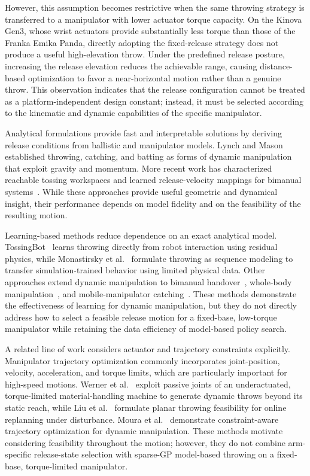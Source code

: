 \documentclass[letterpaper, 10 pt, conference]{ieeeconf}
\begin{document}
However, this assumption becomes restrictive when the same throwing strategy is transferred to a manipulator with lower actuator torque capacity. On the Kinova Gen3, whose wrist actuators provide substantially less torque than those of the Franka Emika Panda, directly adopting the fixed-release strategy does not produce a useful high-elevation throw. Under the predefined release posture, increasing the release elevation reduces the achievable range, causing distance-based optimization to favor a near-horizontal motion rather than a genuine throw. This observation indicates that the release configuration cannot be treated as a platform-independent design constant; instead, it must be selected according to the kinematic and dynamic capabilities of the specific manipulator.

Analytical formulations provide fast and interpretable solutions by deriving release conditions from ballistic and manipulator models. Lynch and Mason~\cite{lynch1999dynamic} established throwing, catching, and batting as forms of dynamic manipulation that exploit gravity and momentum. More recent work has characterized reachable tossing workspaces and learned release-velocity mappings for bimanual systems~\cite{bombile2023bimanual}. While these approaches provide useful geometric and dynamical insight, their performance depends on model fidelity and on the feasibility of the resulting motion.

Learning-based methods reduce dependence on an exact analytical model. TossingBot~\cite{zeng2020tossingbot} learns throwing directly from robot interaction using residual physics, while Monastirsky et al.~\cite{monastirsky2023learning} formulate throwing as sequence modeling to transfer simulation-trained behavior using limited physical data. Other approaches extend dynamic manipulation to bimanual handover~\cite{huang2023dynamic}, whole-body manipulation~\cite{munn2024wholebody}, and mobile-manipulator catching~\cite{zhang2025catch}. These methods demonstrate the effectiveness of learning for dynamic manipulation, but they do not directly address how to select a feasible release motion for a fixed-base, low-torque manipulator while retaining the data efficiency of model-based policy search.

A related line of work considers actuator and trajectory constraints explicitly. Manipulator trajectory optimization commonly incorporates joint-position, velocity, acceleration, and torque limits, which are particularly important for high-speed motions. Werner et al.~\cite{werner2024dynamic} exploit passive joints of an underactuated, torque-limited material-handling machine to generate dynamic throws beyond its static reach, while Liu et al.~\cite{liu2022adaptive} formulate planar throwing feasibility for online replanning under disturbance. Moura et al.~\cite{moura2022nonprehensile} demonstrate constraint-aware trajectory optimization for dynamic manipulation. These methods motivate considering feasibility throughout the motion; however, they do not combine arm-specific release-state selection with sparse-GP model-based throwing on a fixed-base, torque-limited manipulator.
\end{document}

